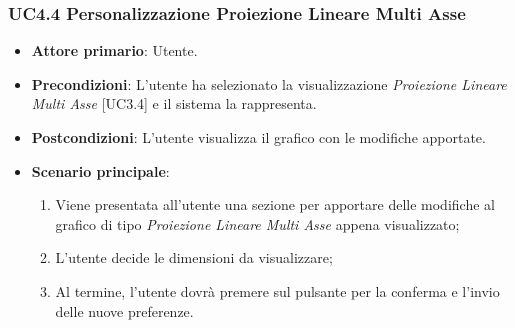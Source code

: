 \subsubsection{UC4.4 Personalizzazione Proiezione Lineare Multi Asse}
\begin{itemize}
	\item \textbf{Attore primario}: Utente.
	\item \textbf{Precondizioni}: L'utente ha selezionato la visualizzazione \textit{Proiezione Lineare Multi Asse} [UC3.4] e il sistema la rappresenta.
	\item \textbf{Postcondizioni}: L'utente visualizza il grafico con le modifiche apportate.
	\item \textbf{Scenario principale}:
	\begin{enumerate}
			\item Viene presentata all'utente una sezione per apportare delle modifiche al grafico di tipo \textit{Proiezione Lineare Multi Asse} appena visualizzato;
			\item L'utente decide le dimensioni da visualizzare;
			\item Al termine, l'utente dovrà premere sul pulsante per la conferma e l'invio delle nuove preferenze.
		\end{enumerate}
\end{itemize}
